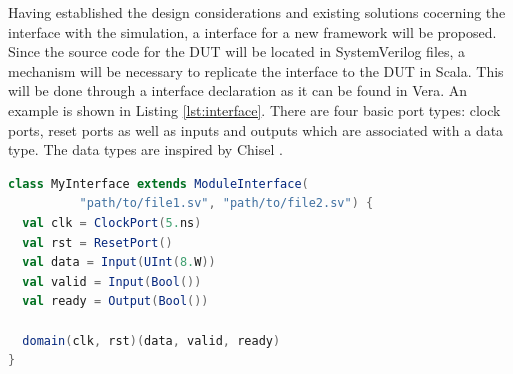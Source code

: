 Having established the design considerations and existing solutions cocerning the interface with the simulation, a
interface for a new framework will be proposed. Since the source code for the DUT will be located in SystemVerilog
files, a mechanism will be necessary to replicate the interface to the DUT in Scala. This will be done through a
interface declaration as it can be found in Vera. An example is shown in Listing \ref{lst:interface}. There are four
basic port types: clock ports, reset ports as well as inputs and outputs which are associated with a data type. The
data types are inspired by Chisel \cite{chiselpaper}.



\begin{listing}
\begin{lstlisting}[language=scala, captionpos=b, caption=Example for an interface declaration in Scala. Each data signal is assocaited with a clock domain.,label=lst:interface]
class MyInterface extends ModuleInterface(
          "path/to/file1.sv", "path/to/file2.sv") {
  val clk = ClockPort(5.ns)
  val rst = ResetPort()
  val data = Input(UInt(8.W))
  val valid = Input(Bool())
  val ready = Output(Bool())

  domain(clk, rst)(data, valid, ready)
}
\end{lstlisting}
\end{listing}

